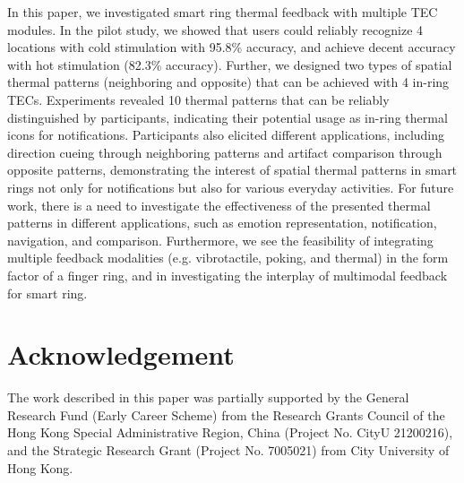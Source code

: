 \documentclass[preprint,12pt]{elsarticle}
\begin{document}
In this paper, we investigated smart ring thermal feedback with multiple TEC modules. In the pilot study, we showed that users could reliably recognize 4 locations with cold stimulation with 95.8\% accuracy, and achieve decent accuracy with hot stimulation (82.3\% accuracy). Further, we designed two types of spatial thermal patterns (neighboring and opposite) that can be achieved with 4 in-ring TECs. Experiments revealed 10 thermal patterns that can be reliably distinguished by participants, indicating their potential usage as in-ring thermal icons for notifications. Participants also elicited different applications, including direction cueing through neighboring patterns and artifact comparison through opposite patterns, demonstrating the interest of spatial thermal patterns in smart rings not only for notifications but also for various everyday activities. For future work, there is a need to investigate the effectiveness of the presented thermal patterns in different applications, such as emotion representation, notification, navigation, and comparison. Furthermore, we see the feasibility of integrating multiple feedback modalities (e.g. vibrotactile, poking, and thermal) in the form factor of a finger ring, and in investigating the interplay of multimodal feedback for smart ring.


\section*{Acknowledgement}
The work described in this paper was partially supported by the General Research Fund (Early Career Scheme) from the Research Grants Council of the Hong Kong Special Administrative Region, China (Project No. CityU 21200216), and the Strategic Research Grant (Project No. 7005021) from City University of Hong Kong.




\end{document}
